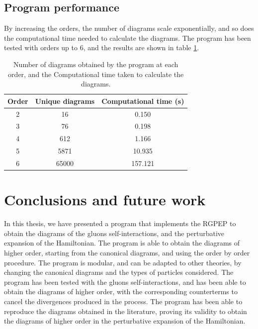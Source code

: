\documentclass[11pt,a4paper,twoside,pdf]{article}
\numberwithin{equation}{section}
\begin{document}
\newpage


\subsection{Program performance}

By increasing the orders, the number of diagrams scale exponentially, and so does 
the computational time needed to calculate the diagrams. The program has been tested
with orders up to 6, and the results are shown in table \ref{tab:time_diagrams}.

\begin{table} [h!]
    \centering
    \begin{tabular}{|c|c|c|}
        \hline
        Order & Unique diagrams & Computational time (s)\\
        \hline
        2  & 16 & 0.150\\
        3  & 76 & 0.198\\
        4  & 612 & 1.166\\
        5  & 5871  & 10.935\\
        6  & 65000  & 157.121\\
        \hline
    \end{tabular}
    \caption{Number of diagrams obtained by the program at each order, and the Computational
    time taken to calculate the diagrams.}
    \label{tab:time_diagrams}
\end{table}

\newpage

\section{Conclusions and future work} \label{sec:conclusions}

In this thesis, we have presented a program that implements the RGPEP to obtain the
diagrams of the gluons self-interactions, and the perturbative expansion of the
Hamiltonian. The program is able to obtain the diagrams of higher order, starting
from the canonical diagrams, and using the order by order procedure.
The program is modular, and can be adapted to other theories, by changing the
canonical diagrams and the types of particles considered.
The program has been tested with the gluons self-interactions, and has been able to
obtain the diagrams of higher order, with the corresponding counterterms to cancel
the divergences produced in the process. The program has been able to reproduce the
diagrams obtained in the literature, proving its validity to obtain the diagrams of
higher order in the perturbative expansion of the Hamiltonian.
\end{document}
